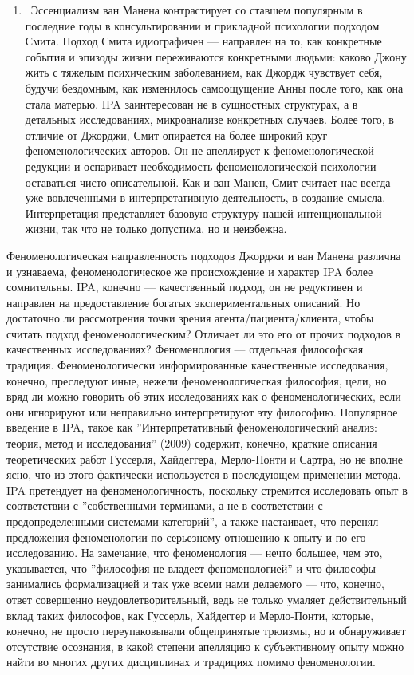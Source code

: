 \documentclass[11pt]{book}
\begin{document}
\begin{enumerate}
  \item\ Эссенциализм ван Манена контрастирует со ставшем популярным в последние годы в консультировании и прикладной психологии подходом Смита. Подход Смита идиографичен --- направлен на то, как конкретные события и эпизоды жизни переживаются конкретными людьми: каково Джону жить с тяжелым психическим заболеванием, как Джордж чувствует себя, будучи бездомным, как изменилось самоощущение Анны после того, как она стала матерью. IPA заинтересован не в сущностных структурах, а в детальных исследованиях, микроанализе конкретных случаев. Более того, в отличие от Джорджи, Смит опирается на более широкий круг феноменологических авторов. Он не апеллирует к феноменологической редукции и оспаривает необходимость феноменологической психологии оставаться чисто описательной. Как и ван Манен, Смит считает нас всегда уже вовлеченными в интерпретативную деятельность, в создание смысла. Интерпретация представляет базовую структуру нашей интенциональной жизни, так что не только допустима, но и неизбежна.

\end{enumerate}

Феноменологическая направленность подходов Джорджи и ван Манена различна и узнаваема, феноменологическое же происхождение и характер IPA более сомнительны. IPA, конечно --- качественный подход, он не редуктивен и направлен на предоставление богатых экспериментальных описаний. Но достаточно ли рассмотрения точки зрения агента/пациента/клиента, чтобы считать подход феноменологическим? Отличает ли это его от прочих подходов в качественных исследованиях? Феноменология --- отдельная философская традиция. Феноменологически информированные качественные исследования, конечно, преследуют иные, нежели феноменологическая философия, цели, но вряд ли можно говорить об этих исследованиях как о феноменологических, если они игнорируют или неправильно интерпретируют эту философию. Популярное введение в IPA, такое как ''Интерпретативный феноменологический анализ: теория, метод и исследования'' (2009) содержит, конечно, краткие описания теоретических работ Гуссерля, Хайдеггера, Мерло-Понти и Сартра, но не вполне ясно, что из этого фактически используется в последующем применении метода. IPA претендует на феноменологичность, поскольку стремится исследовать опыт в соответствии с ''собственными терминами, а не в соответствии с предопределенными системами категорий'', а также настаивает, что перенял предложения феноменологии по серьезному отношению к опыту и по его исследованию. На замечание, что феноменология --- нечто большее, чем это, указывается, что ''философия не владеет феноменологией'' и что философы занимались формализацией и так уже всеми нами делаемого --- что, конечно, ответ совершенно неудовлетворительный, ведь не только умаляет действительный вклад таких философов, как Гуссерль, Хайдеггер и Мерло-Понти, которые, конечно, не просто переупаковывали общепринятые трюизмы, но и обнаруживает отсутствие осознания, в какой степени апелляцию к субъективному опыту можно найти во многих других дисциплинах и традициях помимо феноменологии.
\end{document}

